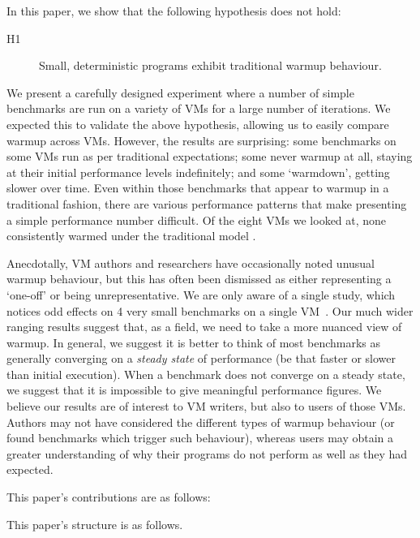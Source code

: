 \documentclass[10pt,preprint]{sigplanconf}
\newcommand{\hypone}{H1\xspace}
\begin{document}
In this paper, we show that the following hypothesis does not hold:
\begin{description}
  \item[\hypone] Small, deterministic programs exhibit traditional warmup behaviour.
\end{description}

We present a carefully designed
experiment where a number of simple benchmarks are run on a variety of
VMs for a large number of iterations. We expected this to validate the above
hypothesis, allowing us to easily compare warmup across VMs. However, the
results are surprising: some benchmarks on some VMs run as per traditional
expectations; some never warmup at all, staying at their initial performance
levels indefinitely; and some `warmdown', getting slower over time. Even within
those benchmarks that appear to warmup in a traditional fashion, there are
various performance patterns that make presenting a simple performance number
difficult. Of the eight VMs we looked at,
none consistently warmed under the traditional model .

Anecdotally, VM authors and researchers have occasionally noted unusual warmup
behaviour, but this has often been dismissed as either representing a `one-off'
or being unrepresentative. We are only aware of a single study, which notices
odd effects on 4 very small benchmarks on a single
VM~\cite{gil11microbenchmark}. Our much wider ranging results suggest that, as a
field, we need to take a more nuanced view
of warmup. In general, we suggest it is better to think of most benchmarks as
generally converging on a \emph{steady state} of performance (be that faster or
slower than initial execution). When a benchmark does not converge on a steady
state, we suggest that it is impossible to give meaningful performance figures.
We believe our results are of interest to VM writers, but also to users of
those VMs. Authors may not have considered the different types of warmup
behaviour (or found benchmarks which trigger such behaviour), whereas users may
obtain a greater understanding of why their programs do not perform as well as
they had expected.

This paper's contributions are as follows:
\begin{enumerate*}
  \item {}
\end{enumerate*}

This paper's structure is as follows. 
\end{document}
